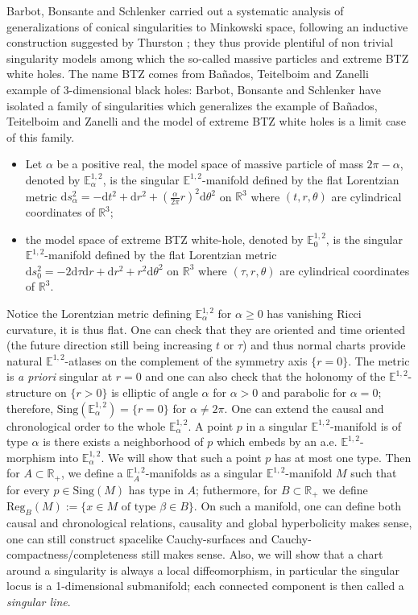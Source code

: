 \documentclass[a4paper,12pt]{article}
\def\d{\mathrm{d}}
\def\sing{\mathrm{Sing}}
\def\RR{\mathbb{R}}
\newcommand{\mass}[1]{{\mathbb E}^{1,2}_{#1}}
\def\Reg{\mathrm{Reg}}
\def\reg{\Reg}
\begin{document}
Barbot, Bonsante and Schlenker \cite{Particules_1} carried out a systematic analysis of generalizations of conical singularities to Minkowski space, following an inductive construction suggested by Thurston \cite{MR1668340};  they thus provide plentiful of non trivial  singularity models among which the so-called massive particles and extreme BTZ white holes. The name BTZ comes from Ba\~nados, Teitelboim and Zanelli \cite{Ba_ados_1992} example of 3-dimensional black holes: Barbot, Bonsante and Schlenker have isolated a family of singularities which generalizes  the example of Ba\~nados, Teitelboim and Zanelli and the model of extreme BTZ white holes is  a limit case of this family.
\begin{itemize}
\item Let $\alpha$ be a positive real, the model space of massive particle of mass $2\pi-\alpha$,  denoted by  $\mass{\alpha}$, is the singular $\mass{}$-manifold defined by the flat Lorentzian metric $\d s_\alpha ^2 = -\d t^2+\d r^2+\left(\frac{\alpha}{2\pi} r\right)^2 \d \theta^2$ on $\RR^3$ where $(t,r,\theta)$ are cylindrical coordinates of $\RR^3$;
\item the model space of extreme BTZ white-hole, denoted by  $\mass{0}$, is the singular $\mass{}$-manifold defined by the flat Lorentzian metric $\d s_0 ^2 = -2\d \tau\d r +\d r^2+r^2 \d \theta^2$ on $\RR^3$ where $(\tau,r,\theta)$ are cylindrical coordinates of $\RR^3$. 
\end{itemize}
Notice the Lorentzian metric defining $\mass{\alpha}$ for $\alpha\geq 0$ has vanishing Ricci curvature, it is thus flat. One can check that they are oriented and time oriented (the future direction still being increasing $t$ or $\tau$) and thus normal charts provide natural $\mass{}$-atlases on the complement of the symmetry axis $\{r=0\}$. 
The metric is {\it a priori} singular at $r=0$ and one can also check that the holonomy of the $\mass{}$-structure on $\{r>0\}$ is elliptic of angle $\alpha$ for $\alpha>0$ and parabolic for $\alpha=0$; therefore, $\sing(\mass{\alpha}) = \{r=0\}$ for $\alpha\neq 2\pi$. One can extend the causal and chronological order to the whole $\mass{\alpha}$. A point $p$ in a singular $\mass{}$-manifold is of type $\alpha$ is there exists a neighborhood of $p$ which embeds by an a.e. $\mass{}$-morphism into $\mass{\alpha}$. 
We will show that such a point $p$ has at most one type.
Then for  $A\subset \RR_+$, we define a $\mass{A}$-manifolds as a singular $\mass{}$-manifold $M$ such that for every $p\in \sing(M)$ has type in $A$; futhermore, for $B\subset \RR_+$ we define $\reg_B(M):=\{x\in M \text{ of type }\beta\in B \}$. On such a manifold, one can define both causal and chronological relations, causality and global hyperbolicity makes sense, one can still construct spacelike Cauchy-surfaces \cite{MR2887877,MR3783554} and Cauchy-compactness/completeness  still makes sense. Also, we will show that a chart around a singularity is always a local diffeomorphism, in particular the singular locus is a 1-dimensional submanifold; each connected component is then called a {\it singular line}.
 
\end{document}
